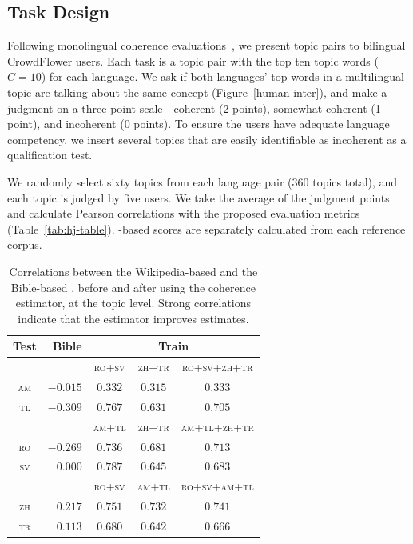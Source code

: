 \subsection{Task Design}

Following monolingual coherence evaluations~\cite{LauNB14}, we present
topic pairs to bilingual CrowdFlower users.  Each task is a topic pair
with the top ten topic words ($C=10$) for each language.  We ask if
both languages' top words in a multilingual topic are talking about
the same concept (Figure~\ref{human-inter}), and make a judgment on a
three-point scale---coherent (2 points), somewhat coherent (1 point),
and incoherent (0 points). To ensure the users have adequate language
competency, we insert several topics that are easily identifiable as
incoherent as a qualification test.

We randomly select sixty topics from each language pair ($360$ topics
total), and each topic is judged by five users. We take the average
of the judgment points and calculate Pearson correlations with
the proposed evaluation metrics (Table~\ref{tab:hj-table}). \npmi{}-based
scores are separately calculated from each reference corpus.


\begin{table}[t!]

	\centering
	\small
		\centering
		\begin{tabular}{crccc}
			\hline
			\textbf{Test} & \textbf{Bible} & \multicolumn{3}{c}{\textbf{Train}} \\ \hline\hline
			& & \textsc{ro+sv} & \textsc{zh+tr} & \textsc{ro+sv+zh+tr} \\  \cline{3-5}
			\textsc{am} &  $-0.015$ & $0.332$ & $0.315$ &  $0.333$ \\
			\textsc{tl} &  $-0.309$ & $0.767$ & $0.631$ &  $0.705$ \\ \hline
			& & \textsc{am+tl} & \textsc{zh+tr} & \textsc{am+tl+zh+tr} \\  \cline{3-5}
			\textsc{ro} &  $-0.269$ & $0.736$ & $0.681$ &  $0.713$ \\
			\textsc{sv} &  $0.000$ & $0.787$ & $0.645$ &  $0.683$ \\ \hline
			& & \textsc{ro+sv} & \textsc{am+tl} & \textsc{ro+sv+am+tl} \\  \cline{3-5}
			\textsc{zh} &  $0.217$ & $0.751$ & $0.732$ &  $0.741$ \\
			\textsc{tr} &  $0.113$ & $0.680$ & $0.642$ &  $0.666$ \\ \hline
		\end{tabular}
	\caption{Correlations between the
          Wikipedia-based \cnpmi{} and the Bible-based \cnpmi{},
          before and after using the coherence estimator, at the topic level. Strong
          correlations indicate that the estimator improves \cnpmi{}
          estimates.}
	\label{tab:est-topic}
\end{table}


